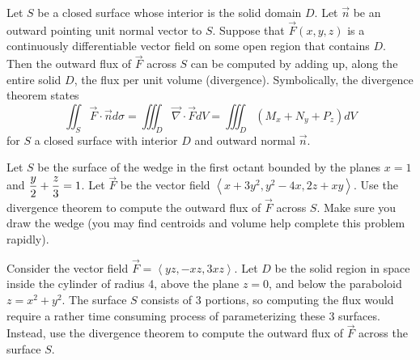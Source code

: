 \begin{theorem}
Let $S$ be a closed surface whose interior is the solid domain $D$. Let $\vec n$ be an outward pointing unit normal vector to $S$. Suppose that $\vec F(x,y,z)$ is a continuously differentiable vector field on some open region that contains $D$. Then the outward flux of $\vec F$ across $S$ can be computed by adding up, along the entire solid $D$, the flux per unit volume (divergence).  Symbolically, the divergence theorem states
$$\iint_S\vec F\cdot \vec n d\sigma =  \iiint_D \vec \nabla \cdot \vec F dV = \iiint_D \left(M_x+N_y+P_z\right) dV $$
for $S$ a closed surface with interior $D$ and outward normal $\vec n$.
\end{theorem}


\begin{problem}
Let $S$ be the surface of the wedge in the first octant bounded by the planes $x=1$ and $\displaystyle\frac{y}{2}+\frac{z}{3}=1$. Let $\vec F$ be the vector field $\left<x+3y^2,y^2-4x,2z+xy\right>$. Use the divergence theorem to compute the outward flux of $\vec F$ across $S$. Make sure you draw the wedge (you may find centroids and volume help complete this problem rapidly).  
\end{problem}

\begin{problem}
Consider the vector field $\vec F = \left<yz,-xz,3xz\right>$.  Let $D$ be the solid region in space inside the cylinder of radius 4, above the plane $z=0$, and below the paraboloid $z=x^2+y^2$.  The surface $S$ consists of 3 portions, so computing the flux would require a rather time consuming process of parameterizing these 3 surfaces.  Instead, use the divergence theorem to compute the outward flux of $\vec F$ across the surface $S$.
\end{problem}

